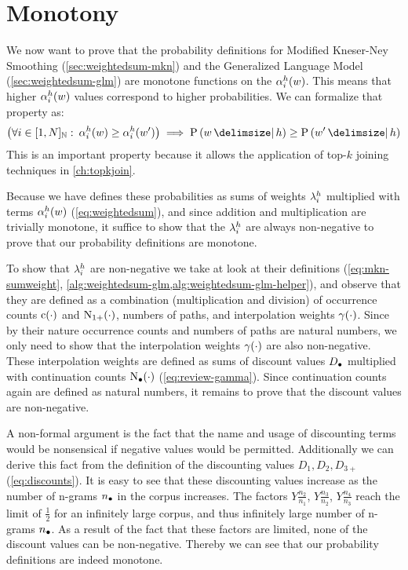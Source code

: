 \section{Monotony}
\label{sec:monotony}

We now want to prove that the probability definitions for Modified Kneser-Ney
Smoothing (\cref{sec:weightedsum-mkn}) and the Generalized Language Model
(\cref{sec:weightedsum-glm}) are monotone functions on the $\alpha^h_i(w)$.
This means that higher $\alpha^h_i(w)$ values correspond to higher
probabilities.
We can formalize that property as:
\begin{equation}
  \big(\forall i \in [1,N]_\NaturalNumbers: \: \SumArg^h_i(w) \geq \SumArg^h_i(w^\prime)\big)
    \implies \Prob{w}{h} \geq \Prob{w^\prime}{h}
\end{equation}
This is an important property because it allows the application of top-$k$
joining techniques in \cref{ch:topkjoin}.

Because we have defines these probabilities as sums of weights $\lambda^h_i$
multiplied with terms $\alpha^h_i(w)$ (\cref{eq:weightedsum}), and since
addition and multiplication are trivially monotone, it suffice to show that the
$\lambda^h_i$ are always non-negative to prove that our probability
definitions are monotone.

To show that $\lambda^h_i$ are non-negative we take at look at their
definitions (\cref{eq:mkn-sumweight},
\cref{alg:weightedsum-glm,alg:weightedsum-glm-helper}),
and observe that they are defined as a combination (multiplication and
division) of occurrence counts $\operatorname{c}(\cdot)$ and
$\operatorname{N}_{1+}(\cdot)$, numbers of paths, and interpolation weights
$\gamma(\cdot)$.
Since by their nature occurrence counts and numbers of paths are natural
numbers, we only need to show that the interpolation weights
$\gamma(\cdot)$ are also non-negative.
These interpolation weights are defined as sums of discount values
$D_\bullet$ multiplied with continuation counts
$\operatorname{N}_\bullet(\cdot)$ (\cref{eq:review-gamma}).
Since continuation counts again are defined as natural numbers, it remains to
prove that the discount values are non-negative.

A non-formal argument is the fact that the name and usage of discounting terms
would be nonsensical if negative values would be permitted.
Additionally we can derive this fact from the definition of the discounting
values $D_1, D_2, D_{3+}$ (\cref{eq:discounts}).
It is easy to see that these discounting values increase as the number of
n-grams $n_\bullet$ in the corpus increases.
The factors $Y \frac{n_2}{n_1}$, $Y \frac{n_3}{n_2}$, $Y \frac{n_4}{n_3}$ reach
the limit of $\frac{1}{2}$ for an infinitely large corpus, and thus infinitely
large number of n-grams $n_\bullet$.
As a result of the fact that these factors are limited, none of the discount
values can be non-negative.
Thereby we can see that our probability definitions are indeed monotone.
